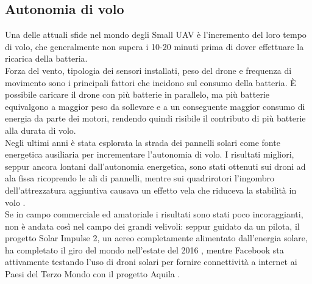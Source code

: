 \subsection[Autonomia di volo]{Autonomia di volo}
Una delle attuali sfide nel mondo degli Small UAV è l'incremento del loro tempo di volo, che generalmente non supera i 10-20 minuti prima di dover effettuare la ricarica della batteria. \\
Forza del vento, tipologia dei sensori installati, peso del drone e frequenza di movimento sono i principali fattori che incidono sul consumo della batteria. 
È possibile caricare il drone con più batterie in parallelo, ma più batterie equivalgono a maggior peso da sollevare e a un conseguente maggior consumo di energia da parte dei motori, rendendo quindi risibile il contributo di più batterie alla durata di volo.\\
Negli ultimi anni è stata esplorata la strada dei pannelli solari come fonte energetica ausiliaria per incrementare l'autonomia di volo. 
I risultati migliori, seppur ancora lontani dall'autonomia energetica, sono stati ottenuti sui droni ad ala fissa \cite{newatlas} ricoprendo le ali di pannelli, mentre sui quadrirotori l'ingombro dell'attrezzatura aggiuntiva causava un effetto vela che riduceva la stabilità in volo \cite{diydrones}.\\ Se in campo commerciale ed amatoriale i risultati sono stati poco incoraggianti, non è andata così nel campo dei grandi velivoli: seppur guidato da un pilota, il progetto Solar Impulse 2, un aereo completamente alimentato dall'energia solare, ha completato il giro del mondo nell'estate del 2016 \cite{theguardian}, mentre Facebook sta attivamente testando l'uso di droni solari per fornire connettività a internet ai Paesi del Terzo Mondo con il progetto Aquila \cite{fbaquila}.\\

\clearpage

